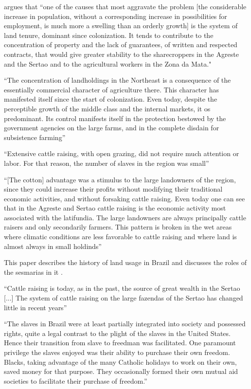 \documentclass{article}
\begin{document}
\textcite[p.~34-35]{De_Oliveira_Andrade1980-xz} argues that 
``one of the causes that most aggravate the problem [the considerable increase in population, without a corresponding increase in possibilities for employment, is much more a swelling than an orderly growth] is the system of land tenure, dominant since colonization. It tends to contribute to the concentration of property and the lack of guarantees, of written and respected contracts, that would give greater stability to the sharecroppers in the Agreste and the Sertao and to the agricultural workers in the Zona da Mata."

\textcite[p.~36]{De_Oliveira_Andrade1980-xz}
``The concentration of landholdings in the Northeast is a consequence of the essentially commercial character of agriculture there. This character has manifested itself since the start of colonization. Even today, despite the perceptible growth of the middle class and the internal markets, it os predominant. Its control manifests itself in the protection bestowed by the government agencies on the large farms, and in the complete disdain for subsistence farming''

\textcite[p.~113]{De_Oliveira_Andrade1980-xz}
``Extensive cattle raising, with open grazing, did not require much attention or labor. For that reason, the number of slaves in the region was small''

\textcite[p.~119]{De_Oliveira_Andrade1980-xz}
``[The cotton] advantage was a stimulus to the large landowners of the region, since they could increase their profits without modifying their traditional economic activities, and without forsaking cattle raising. Even today one can see that in the Agreste and Sertao cattle raising is the economic activity most associated with the latifundia. The large landowners are always principally cattle raisers and only secondarily farmers. This pattern is broken in the wet areas where climatic conditions are less favorable to cattle raising and where land is almost always in small holdinds''

This paper describes the history of land usage in Brazil and discusses the roles of the sesmarias in it \parencite{Reydon2015-ff}.

\textcite[p.~157]{De_Oliveira_Andrade1980-xz}
``Cattle raising is today, as in the past, the source of great wealth in the Sertao [...] The system of cattle raising on the large fazendas of the Sertao has changed little in recent years''

``The slaves in Brazil were at least partially integrated into society and possessed rights, quite a legal contrast to the plight of the slaves in the United States. Hence their transition from slave to freedman was facilitated. One paramount privilege the slaves enjoyed was their ability to purchase their
own freedom. Blacks, taking advantage of the many Catholic holidays to work on their own, saved money for that purpose. They occasionally formed their own mutual aid societies to facilitate their purchase of freedom.''
\end{document}
